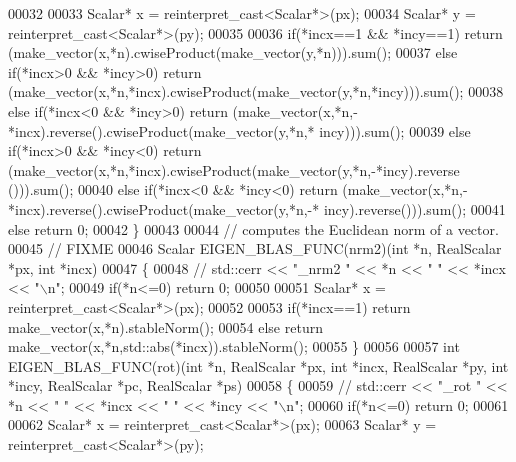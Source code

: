\begin{DoxyCode}
00032 
00033   Scalar* x = \textcolor{keyword}{reinterpret\_cast<}Scalar*\textcolor{keyword}{>}(px);
00034   Scalar* y = \textcolor{keyword}{reinterpret\_cast<}Scalar*\textcolor{keyword}{>}(py);
00035 
00036   \textcolor{keywordflow}{if}(*incx==1 && *incy==1)    \textcolor{keywordflow}{return} (make\_vector(x,*n).cwiseProduct(make\_vector(y,*n))).sum();
00037   \textcolor{keywordflow}{else} \textcolor{keywordflow}{if}(*incx>0 && *incy>0) \textcolor{keywordflow}{return} (make\_vector(x,*n,*incx).cwiseProduct(make\_vector(y,*n,*incy))).sum();
00038   \textcolor{keywordflow}{else} \textcolor{keywordflow}{if}(*incx<0 && *incy>0) \textcolor{keywordflow}{return} (make\_vector(x,*n,-*incx).reverse().cwiseProduct(make\_vector(y,*n,*
      incy))).sum();
00039   \textcolor{keywordflow}{else} \textcolor{keywordflow}{if}(*incx>0 && *incy<0) \textcolor{keywordflow}{return} (make\_vector(x,*n,*incx).cwiseProduct(make\_vector(y,*n,-*incy).reverse
      ())).sum();
00040   \textcolor{keywordflow}{else} \textcolor{keywordflow}{if}(*incx<0 && *incy<0) \textcolor{keywordflow}{return} (make\_vector(x,*n,-*incx).reverse().cwiseProduct(make\_vector(y,*n,-*
      incy).reverse())).sum();
00041   \textcolor{keywordflow}{else} \textcolor{keywordflow}{return} 0;
00042 \}
00043 
00044 \textcolor{comment}{// computes the Euclidean norm of a vector.}
00045 \textcolor{comment}{// FIXME}
00046 Scalar EIGEN\_BLAS\_FUNC(nrm2)(\textcolor{keywordtype}{int} *n, RealScalar *px, \textcolor{keywordtype}{int} *incx)
00047 \{
00048 \textcolor{comment}{//   std::cerr << "\_nrm2 " << *n << " " << *incx << "\(\backslash\)n";}
00049   \textcolor{keywordflow}{if}(*n<=0) \textcolor{keywordflow}{return} 0;
00050 
00051   Scalar* x = \textcolor{keyword}{reinterpret\_cast<}Scalar*\textcolor{keyword}{>}(px);
00052 
00053   \textcolor{keywordflow}{if}(*incx==1)  \textcolor{keywordflow}{return} make\_vector(x,*n).stableNorm();
00054   \textcolor{keywordflow}{else}          \textcolor{keywordflow}{return} make\_vector(x,*n,std::abs(*incx)).stableNorm();
00055 \}
00056 
00057 \textcolor{keywordtype}{int} EIGEN\_BLAS\_FUNC(rot)(\textcolor{keywordtype}{int} *n, RealScalar *px, \textcolor{keywordtype}{int} *incx, RealScalar *py, \textcolor{keywordtype}{int} *incy, RealScalar *pc, 
      RealScalar *ps)
00058 \{
00059 \textcolor{comment}{//   std::cerr << "\_rot " << *n << " " << *incx << " " << *incy << "\(\backslash\)n";}
00060   \textcolor{keywordflow}{if}(*n<=0) \textcolor{keywordflow}{return} 0;
00061 
00062   Scalar* x = \textcolor{keyword}{reinterpret\_cast<}Scalar*\textcolor{keyword}{>}(px);
00063   Scalar* y = \textcolor{keyword}{reinterpret\_cast<}Scalar*\textcolor{keyword}{>}(py);

\end{DoxyCode}
